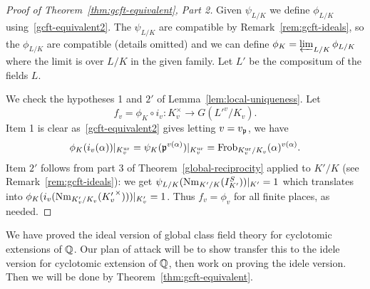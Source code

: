 \begin{proof}[Proof of Theorem~\ref{thm:gcft-equivalent}, Part 2]
Given $\psi_{L/K}$ we define $\phi_{L/K}$ using~\eqref{gcft-equivalent2}.
The $\psi_{L/K}$ are compatible by Remark~\eqref{rem:gcft-ideals}, so the $\phi_{L/K}$ are compatible (details omitted) and we can define $\phi_{K}=\varprojlim_{L/K} \phi_{L/K}$ where the limit is over $L/K$ in the given family. Let $L'$ be the compositum of the fields $L$.

We check the hypotheses 1 and $2'$ of Lemma~\ref{lem:local-uniqueness}. Let 
\[f_v=\phi_K\circ i_v:K_v^{\times}\to G({L'}^v/K_v).\]
Item 1 is clear as~\eqref{gcft-equivalent2} gives letting $v=v_{\mathfrak{p}}$, we have
\[
\phi_{K}(i_v(\alpha))|_{K_v^{\text{ur}}}=\psi_{K}(\mathfrak{p}^{v(\alpha)})|_{K_v^{\text{ur}}}=\operatorname{Frob}_{K_v^{\text{ur}}/K_v}(\alpha)^{v(\alpha)}.
\]
Item $2'$ follows from part 3 of Theorem~\ref{global-reciprocity} applied to $K'/K$ (see Remark~\ref{rem:gcft-ideals}): we get $\psi_{{L}/K}(\operatorname{Nm}_{K'/K}(I_{K'}^S))|_{K'}=1$ which translates into $\phi_K(i_v(\operatorname{Nm}_{K_v'/K_v}({K_v'}^{\times})))|_{K'_v}=1$. Thus $f_v=\phi_v$ for all finite places, as needed.
\end{proof}

We have proved the ideal version of global class field theory for cyclotomic extensions of $\mathbb{Q}$. Our plan of attack will be to show transfer this to the idele version for cyclotomic extension of $\mathbb{Q}$, then work on proving the idele version. Then we will be done by Theorem~\ref{thm:gcft-equivalent}.


